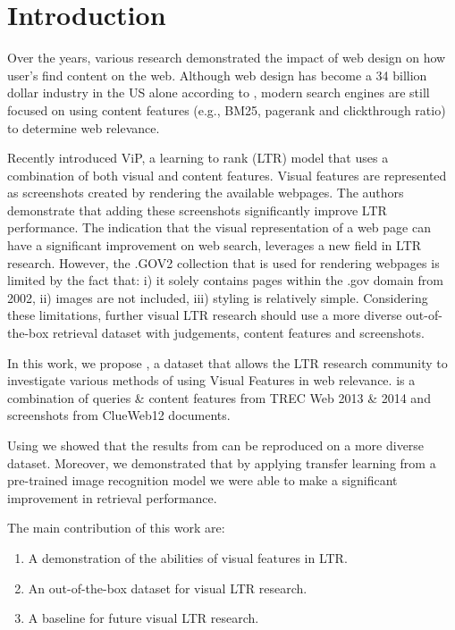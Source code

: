 

\section{Introduction}
Over the years, various research demonstrated the impact of web design on how user's find content on the web\cite{nielsen1999designing}\cite{nielsen2006f}\cite{pernice2017f}.  Although web design has become a 34 billion dollar industry in the US alone according to \citet{ibisdesign}, modern search engines are still focused on using content features (e.g., BM25, pagerank and clickthrough ratio) to determine web relevance. 

Recently \citet{fan2017learning} introduced ViP, a learning to rank (LTR) model that uses a combination of both visual and content features. Visual features are represented as screenshots created by rendering the available webpages. The authors demonstrate that adding these screenshots significantly improve LTR performance. The indication that the visual representation of a web page can have a significant improvement on web search, leverages a new field in LTR research. 
However, the .GOV2 collection that is used for rendering webpages is limited by the fact that: i) it solely contains pages within the .gov domain from 2002, ii) images are not included, iii) styling is relatively simple. Considering these limitations, further visual LTR research should use a more diverse out-of-the-box retrieval dataset with judgements, content features and screenshots. 

In this work, we propose \datasetname, a dataset that allows the LTR research community to investigate various methods of using Visual Features in web relevance. \datasetname is a combination of queries \& content features from TREC Web 2013 \& 2014 and screenshots from ClueWeb12 documents. 

Using \datasetname we showed that the results from \citet{fan2017learning} can be reproduced on a more diverse dataset. Moreover, we demonstrated that by applying transfer learning from a pre-trained image recognition model we were able to make a significant improvement in retrieval performance. 

The main contribution of this work are:
\begin{enumerate}  
\item A demonstration of the abilities of visual features in LTR.
\item An out-of-the-box dataset for visual LTR research.
\item A baseline for future visual LTR research.
\end{enumerate}

